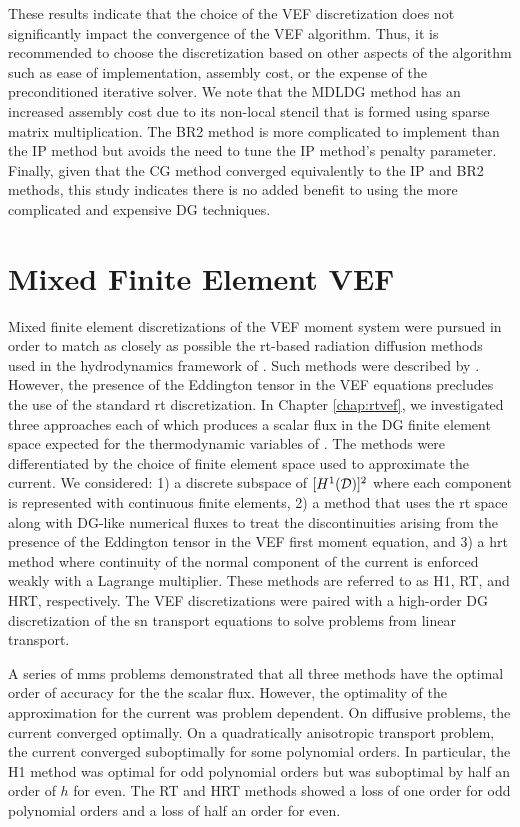 \documentclass[../doc.tex]{subfiles}
\begin{document}
These results indicate that the choice of the VEF discretization does not significantly impact the convergence of the VEF algorithm. Thus, it is recommended to choose the discretization based on other aspects of the algorithm such as ease of implementation, assembly cost, or the expense of the preconditioned iterative solver. We note that the MDLDG method has an increased assembly cost due to its non-local stencil that is formed using sparse matrix multiplication. The BR2 method is more complicated to implement than the IP method but avoids the need to tune the IP method's penalty parameter. Finally, given that the CG method converged equivalently to the IP and BR2 methods, this study indicates there is no added benefit to using the more complicated and expensive DG techniques. 

\section{Mixed Finite Element VEF}
Mixed finite element discretizations of the VEF moment system were pursued in order to match as closely as possible the \gls{rt}-based radiation diffusion methods used in the hydrodynamics framework of \cite{blast}. Such methods were described by \textcite{pete}. However, the presence of the Eddington tensor in the VEF equations precludes the use of the standard \gls{rt} discretization. In Chapter \ref{chap:rtvef}, we investigated three approaches each of which produces a scalar flux in the DG finite element space expected for the thermodynamic variables of \cite{blast}. 
The methods were differentiated by the choice of finite element space used to approximate the current. We considered: 1) a discrete subspace of $[H^1(\mathcal{D})]^2$ where each component is represented with continuous finite elements, 2) a method that uses the \gls{rt} space along with DG-like numerical fluxes to treat the discontinuities arising from the presence of the Eddington tensor in the VEF first moment equation, and 3) a \gls{hrt} method where continuity of the normal component of the current is enforced weakly with a Lagrange multiplier. These methods are referred to as H1, RT, and HRT, respectively. The VEF discretizations were paired with a high-order DG discretization of the \gls{sn} transport equations to solve problems from linear transport. 

A series of \gls{mms} problems demonstrated that all three methods have the optimal order of accuracy for the the scalar flux. However, the optimality of the approximation for the current was problem dependent. On diffusive problems, the current converged optimally. On a quadratically anisotropic transport problem, the current converged suboptimally for some polynomial orders. In particular, the H1 method was optimal for odd polynomial orders but was suboptimal by half an order of $h$ for even. The RT and HRT methods showed a loss of one order for odd polynomial orders and a loss of half an order for even. 
\end{document}
